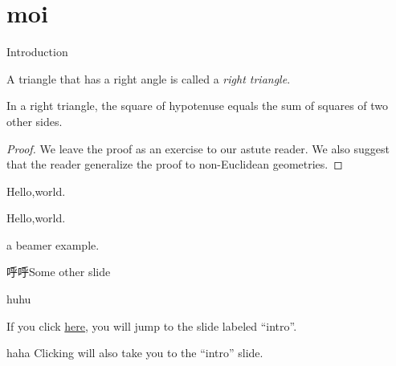 \documentclass[xcolor=dvipsnames]{beamer}
\begin{document}
\section{moi}
\begin{frame}[label=intro]{Introduction}

  \begin{definition}
    A triangle that has a right angle is called
    a \emph{right triangle}.
  \end{definition}

  \pause

  \begin{theorem}
    In a right triangle, the square of hypotenuse equals
    the sum of squares of two other sides.
  \end{theorem}

  \pause

  \begin{proof}
    We leave the proof as an exercise to our astute reader.
    We also suggest that the reader generalize the proof to
    non-Euclidean geometries.
  \end{proof}
\end{frame}
\begin{frame}{Hello,world.}
  \begin{corollary}
    Hello,world.
  \end{corollary}
  \pause
  \begin{example}
    a beamer example.
  \end{example}
\end{frame}


\begin{frame}{呼呼}{Some other slide}
  \begin{block}{}
    huhu
  \end{block}
  If you click \hyperlink{intro}{here}, you will jump to the slide
  labeled ``intro''.
  \bigskip
  \begin{block}{haha}
    Clicking \hyperlink{intro}{} will also
    take you to the ``intro'' slide.
  \end{block}

\end{frame}
\end{document}
